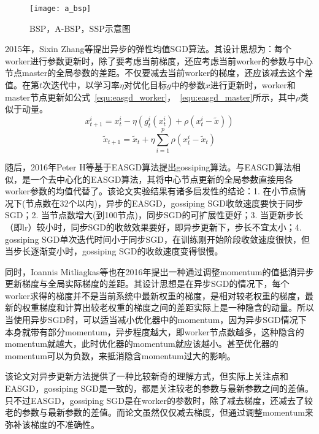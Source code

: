 \begin{figure}[htp]
\centering
\texttt{[image: a\_bsp]}
\caption{BSP，A-BSP，SSP示意图}
\label{fig:a_bsp}
\end{figure}
2015年，Sixin Zhang等提出异步的弹性均值SGD算法。其设计思想为：每个worker进行参数更新时，除了要考虑当前梯度，还应考虑当前worker的参数与中心节点master的全局参数的差距。不仅要减去当前worker的梯度，还应该减去这个差值。在第$t$次迭代中，以学习率$\eta$对优化目标$g$中的参数$x$进行更新时，worker和master节点更新如公式~\ref{equ:easgd_worker}，~\ref{equ:easgd_master}所示，其中$\rho$类似于动量。
\begin{equation}
\label{equ:easgd_worker}
x^{i}_{t+1}=x^i_t-\eta(g^i_t(x^i_t)+\rho(x^i_t-\widetilde x))
\end{equation}
\begin{equation}
\label{equ:easgd_master}
\widetilde x_{t+1}=\widetilde x_t +\eta \sum_{i=1}^{p}\rho(x^i_t - \widetilde x_t)
\end{equation}

随后，2016年Peter H等基于EASGD算法提出gossiping算法。与EASGD算法相似，是一个去中心化的EASGD算法，其将中心节点更新的全局参数直接用各worker参数的均值代替了。该论文实验结果有诸多启发性的结论：1. 在小节点情况下(节点数在32个以内)，异步的EASGD，gossiping SGD收敛速度要快于同步SGD；2. 当节点数增大(到100节点)，同步SGD的可扩展性更好；3. 当更新步长（即lr）较小时，同步SGD的收敛效果要好，即异步更新下，步长不宜太小；4. gossiping SGD单次迭代时间小于同步SGD，在训练刚开始阶段收敛速度很快，但当步长逐渐变小时，gossiping SGD的收敛速度变得很慢。

同时，Ioannis Mitliagkas等也在2016年提出一种通过调整momentum的值抵消异步更新梯度与全局实际梯度的差距。其设计思想是在异步SGD的情况下，每个worker求得的梯度并不是当前系统中最新权重的梯度，是相对较老权重的梯度，最新的权重梯度和计算出较老权重的梯度之间的差距实际上是一种隐含的动量。所以当使用异步SGD时，可以适当减小优化器中的momentum，因为异步SGD情况下本身就带有部分momentum，异步程度越大，即worker节点数越多，这种隐含的momentum就越大，此时优化器的momentum就应该越小。甚至优化器的momentum可以为负数，来抵消隐含momentum过大的影响。

该论文对异步更新方法提供了一种比较新奇的理解方式，但实际上关注点和EASGD，gossiping SGD是一致的，都是关注较老的参数与最新参数之间的差值。只不过EASGD，gossiping SGD是在worker的参数时，除了减去梯度，还减去了较老的参数与最新参数的差值。而论文虽然仅仅减去梯度，但通过调整momentum来弥补该梯度的不准确性。


